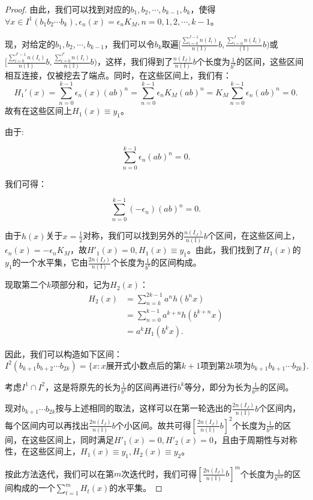 \begin{proof}
由此，我们可以找到对应的$b_1,b_2,\cdots,b_{k-1},b_k$，使得$\forall x\in I^1(b_1b_2\cdots b_k),\epsilon_n(x)=\epsilon_nK_M,n=0,1,2,\cdots,k-1$。

现，对给定的$b_1,b_2,\cdots,b_{k-1}$，我们可以令$b_k$取遍${[}\frac{\sum_{i=0}^{J-1}n(I_i)}{n(\mathbb{I})}b,\frac{\sum_{i=0}^{J}n(I_i)}{(\mathbb{I})}b{)}$或${[}\frac{\sum_{i=0}^{J'-1}n(I_i)}{n(\mathbb{I})}b,\frac{\sum_{i=0}^{J'}n(I_i)}{n(\mathbb{I})}b{)}$，这样，我们得到了$\frac{n(I_J)}{n(\mathbb{I})}b$个长度为$\frac{1}{b^k}$的区间，这些区间相互连接，仅被挖去了端点。同时，在这些区间上，我们有：
$$
      H_1'(x)=\sum_{n=0}^{k-1}\epsilon_n(x)(ab)^n=\sum_{n=0}^{k-1}\epsilon_nK_M(ab)^n=K_M\sum_{n=0}^{k-1}\epsilon_n(ab)^n=0.
$$
故有在这些区间上$H_1(x)\equiv y_1$。

由于:

$$
      \sum_{n=0}^{k-1}\epsilon_n(ab)^n=0.
$$

我们可得：

$$
      \sum_{n=0}^{k-1}(-\epsilon_n)(ab)^n=0.
$$

由于$h(x)$关于$x=\frac{1}{2}$对称，我们可以找到另外的$\frac{n(I_J)}{n(\mathbb{I})}b$个区间，在这些区间上，$\epsilon_n(x)=-\epsilon_nK_M$，故$H'_1(x)=0,H_1(x)\equiv y_1$。由此，我们找到了$H_1(x)$的$y_1$的一个水平集，它由$\frac{2n(I_J)}{n(\mathbb{I})}$个长度为$\frac{1}{b^k}$的区间构成。

现取第二个$k$项部分和，记为$H_2(x)$：
$$
      \begin{aligned}
            H_2(x)&= \sum_{n=k}^{2k-1}a^nh(b^nx)\\
                  &= \sum_{n=0}^{k-1}a^{k+n}h(b^{k+n}x)\\
                  &= a^kH_1(b^kx).
      \end{aligned}
$$

因此，我们可以构造如下区间：
$$
      I^2(b_{k+1}b_{b+2}\cdots b_{2k})=\{x:x\mbox{展开式小数点后的第}k+1\mbox{项到第}2k\mbox{项为}b_{k+1}b_{k+1}\cdots b_{2k}\}.
$$

考虑$I^1\cap I^2$，这是将原先的长为$\frac{1}{b^k}$的区间再进行$b^k$等分，即分为长为$\frac{1}{b^{2k}}$的区间。

现对$b_{k+1}\cdots b_{2k}$按与上述相同的取法，这样可以在第一轮选出的$\frac{2n(I_J)}{n(\mathbb{I})}b$个区间内，每个区间内可以再找出$\frac{2n(I_J)}{n(\mathbb{I})}b$个小区间。故共可得$[\frac{2n(I_J)}{n(\mathbb{I})}b]^2$个长度为$\frac{1}{b^{2k}}$的区间，在这些区间上，同时满足$H'_1(x)=0,H'_2(x)=0$，且由于周期性与对称性，在这些区间上，$H_1(x)\equiv y_1,H_2(x)\equiv y_2$。

按此方法迭代，我们可以在第$m$次迭代时，我们可得$[\frac{2n(I_J)}{n(\mathbb{I})}b]^m$个长度为$\frac{1}{b^{mk}}$的区间构成的一个$\sum_{t=1}^mH_t(x)$的水平集。


\end{proof}
